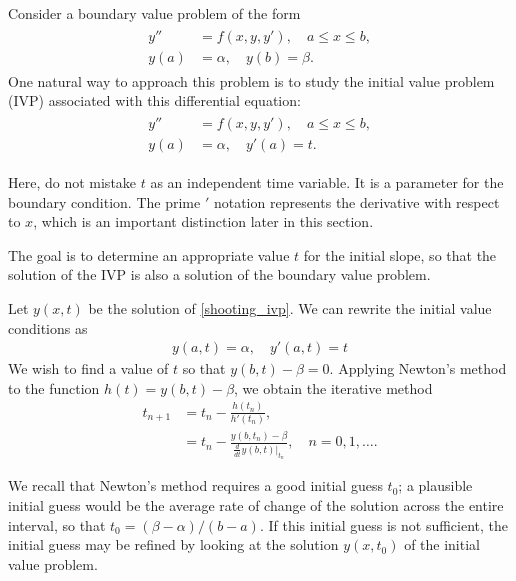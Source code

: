 \label{lab:Shooting}

Consider a boundary value problem of the form
\begin{align}
	\label{shooting_bvp}
	\begin{split}
y'' &= f(x,y,y'), \quad a \leq x \leq b, \\
y(a) &= \alpha, \quad y(b) = \beta.
\end{split}
\end{align}
One natural way to approach this problem is to study the initial value problem (IVP) associated with this differential equation:
\begin{align}
	\label{shooting_ivp}
	\begin{split}
y'' &= f(x,y,y'), \quad a \leq x \leq b, \\
y(a) &= \alpha, \quad y'(a) = t.
	\end{split}
\end{align}

\begin{warn}
Here, do not mistake $t$ as an independent time variable.
It is a parameter for the boundary condition.
The prime $'$ notation represents the derivative with respect to $x$, which is an important distinction later in this section.
\end{warn}
The goal is to determine an  appropriate value $t$ for the initial slope, so that the solution of the IVP is also a solution of the boundary value problem.

Let $y(x,t)$ be the solution of \eqref{shooting_ivp}.
We can rewrite the initial value conditions as
\begin{align}
y(a, t) = \alpha, \quad y'(a, t) = t
\end{align}
We wish to find a value of $t$ so that $y(b,t) - \beta = 0$.
Applying Newton's method to the function $h(t) = y(b,t) - \beta$, we obtain the iterative method
\begin{align*}
	t_{n+1} &= t_n - \frac{ h(t_n)}{h'(t_n) }, \\
	&= t_n - \frac{ y(b,t_n) - \beta}{\frac{d}{dt} \left.y(b,t)\right|_{t_n} },\quad n = 0,1,\ldots .
\end{align*}

We recall that Newton's method requires a good initial guess $t_0$; a plausible initial guess would be the average rate of change of the solution across the entire interval, so that $t_0 =  (\beta - \alpha)/(b-a)$.
If this initial guess is not sufficient, the initial guess may be refined by looking at the solution $y(x,t_0)$ of the initial value problem.

